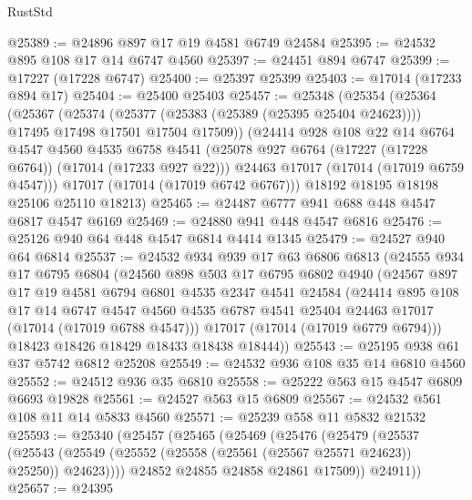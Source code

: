 \begin{lexlean}{RustStd}
\begin{coremodule}
{\begin{coremodule}
{{{{{{{{{{{{{{{{{{{{{{{{{{{{{{{{{{{{{{{{{{{{{{{{{{{{{{{@25389 := @24896 @897 @17 @19 @4581 @6749 @24584
@25395 := @24532 @895 @108 @17 @14 @6747 @4560
@25397 := @24451 @894 @6747
@25399 := @17227 (@17228 @6747)
@25400 := @25397 @25399
@25403 := @17014 (@17233 @894 @17)
@25404 := @25400 @25403
@25457 := @25348
    (@25354
      (@25364
        (@25367
          (@25374
            (@25377 (@25383 (@25389 (@25395 @25404 @24623))))
            @17495
            @17498
            @17501
            @17504
            @17509))
        (@24414
          @928
          @108
          @22
          @14
          @6764
          @4547
          @4560
          @4535
          @6758
          @4541
          (@25078 @927 @6764 (@17227 (@17228 @6764)) (@17014 (@17233 @927 @22)))
          @24463
          @17017
          (@17014 (@17019 @6759 @4547)))
        @17017
        (@17014 (@17019 @6742 @6767)))
      @18192
      @18195
      @18198
      @25106
      @25110
      @18213)
@25465 := @24487 @6777 @941 @688 @448 @4547 @6817 @4547 @6169
@25469 := @24880 @941 @448 @4547 @6816
@25476 := @25126 @940 @64 @448 @4547 @6814 @4414 @1345
@25479 := @24527 @940 @64 @6814
@25537 := @24532
    @934
    @939
    @17
    @63
    @6806
    @6813
    (@24555
      @934
      @17
      @6795
      @6804
      (@24560
        @898
        @503
        @17
        @6795
        @6802
        @4940
        (@24567
          @897
          @17
          @19
          @4581
          @6794
          @6801
          @4535
          @2347
          @4541
          @24584
          (@24414
            @895
            @108
            @17
            @14
            @6747
            @4547
            @4560
            @4535
            @6787
            @4541
            @25404
            @24463
            @17017
            (@17014 (@17019 @6788 @4547)))
          @17017
          (@17014 (@17019 @6779 @6794)))
        @18423
        @18426
        @18429
        @18433
        @18438
        @18444))
@25543 := @25195 @938 @61 @37 @5742 @6812 @25208
@25549 := @24532 @936 @108 @35 @14 @6810 @4560
@25552 := @24512 @936 @35 @6810
@25558 := @25222 @563 @15 @4547 @6809 @6693 @19828
@25561 := @24527 @563 @15 @6809
@25567 := @24532 @561 @108 @11 @14 @5833 @4560
@25571 := @25239 @558 @11 @5832 @21532
@25593 := @25340
    (@25457
      (@25465
        (@25469
          (@25476
            (@25479
              (@25537
                (@25543 (@25549 (@25552 (@25558 (@25561 (@25567 @25571 @24623)) @25250)) @24623))))
            @24852
            @24855
            @24858
            @24861
            @17509))
        @24911))
@25657 := @24395
}}}}}}}}}}}}}}}}}}}}}}}}}}}}}}}}}}}}}}}}}}}}}}}}}}}}}}}
\end{coremodule}}
\end{coremodule}
\end{lexlean}
